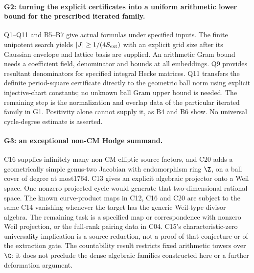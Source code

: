 \paragraph{G2: turning the explicit certificates into a uniform
arithmetic lower bound for the prescribed iterated family.}
Q1--Q11 and B5--B7 give actual formulas under specified inputs.
The finite unipotent search yields $|J|\geq1/(4S_{\rm ext})$ with
an explicit grid size after its Gaussian envelope and lattice basis
are supplied. An arithmetic Gram bound needs a coefficient field,
denominator and bounds at all embeddings. Q9 provides resultant
denominators for specified integral Hecke matrices. Q11 transfers
the definite period-square certificate directly to the geometric
ball norm using explicit injective-chart constants; no unknown
ball Gram upper bound is needed. The remaining
step is the normalization and overlap data of the particular
iterated family in G1. Positivity alone cannot supply it, as B4
and B6 show. No universal cycle-degree estimate is asserted.

\paragraph{G3: an exceptional non-CM Hodge summand.}
C16 supplies infinitely many non-CM elliptic source factors, and
C20 adds a geometrically simple genus-two Jacobian with
endomorphism ring $\Z$, on a ball cover of degree at most1764.
C13 gives
an explicit algebraic projector onto a Weil space. One nonzero
projected cycle would generate that two-dimensional rational space.
The known curve-product maps in C12, C16 and C20 are subject to the
same C14 vanishing whenever the target has the generic Weil-type
divisor algebra. The remaining task is a specified map or correspondence
with nonzero Weil projection, or the full-rank pairing data in C04.
C15's characteristic-zero universality implication is a source
reduction, not a proof of that conjecture or of the extraction gate.
The countability result restricts fixed arithmetic towers over
$\C$; it does not preclude the dense algebraic families constructed
here or a further deformation argument.

